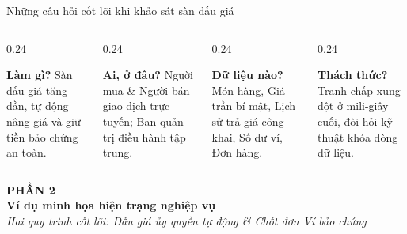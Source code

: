 \documentclass[aspectratio=169, 10pt]{beamer}
\begin{document}
\begin{frame}{Những câu hỏi cốt lõi khi khảo sát sàn đấu giá}
    \begin{columns}[t]
        \begin{column}{0.24\textwidth}
            \begin{block}{\centering \textbf{Làm gì?}}
                \footnotesize Sàn đấu giá tăng dần, tự động nâng giá và giữ tiền bảo chứng an toàn.
            \end{block}
        \end{column}
        \begin{column}{0.24\textwidth}
            \begin{block}{\centering \textbf{Ai, ở đâu?}}
                \footnotesize Người mua \& Người bán giao dịch trực tuyến; Ban quản trị điều hành tập trung.
            \end{block}
        \end{column}
        \begin{column}{0.24\textwidth}
            \begin{block}{\centering \textbf{Dữ liệu nào?}}
                \footnotesize Món hàng, Giá trần bí mật, Lịch sử trả giá công khai, Số dư ví, Đơn hàng.
            \end{block}
        \end{column}
        \begin{column}{0.24\textwidth}
            \begin{block}{\centering \textbf{Thách thức?}}
                \footnotesize Tranh chấp xung đột ở mili-giây cuối, đòi hỏi kỹ thuật khóa dòng dữ liệu.
            \end{block}
        \end{column}
    \end{columns}
\end{frame}

\begin{frame}
    \begin{center}
        \vspace{1.5cm}
        {\Large \textbf{\color{primaryNavy}PHẦN 2}}\\[0.5cm]
        {\huge \textbf{\color{primaryNavy}Ví dụ minh họa hiện trạng nghiệp vụ}}\\[0.6cm]
        \textit{\color{secondarySlate}Hai quy trình cốt lõi: Đấu giá ủy quyền tự động \& Chốt đơn Ví bảo chứng}
    \end{center}
\end{frame}
\end{document}
